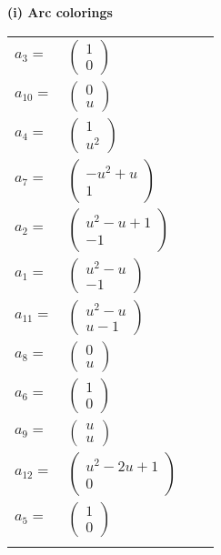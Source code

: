 \documentclass[1p]{elsarticle_modified}
\theoremstyle{definition}
\begin{document}
\flushleft \textbf{(i) Arc colorings}\\
\begin{tabular}{m{7pt} m{180pt} m{7pt} m{180pt} }
\flushright $a_{3}=$&$\begin{pmatrix}1\\0\end{pmatrix}$ \\
\flushright $a_{10}=$&$\begin{pmatrix}0\\u\end{pmatrix}$ \\
\flushright $a_{4}=$&$\begin{pmatrix}1\\u^2\end{pmatrix}$ \\
\flushright $a_{7}=$&$\begin{pmatrix}- u^2+u\\1\end{pmatrix}$ \\
\flushright $a_{2}=$&$\begin{pmatrix}u^2- u+1\\-1\end{pmatrix}$ \\
\flushright $a_{1}=$&$\begin{pmatrix}u^2- u\\-1\end{pmatrix}$ \\
\flushright $a_{11}=$&$\begin{pmatrix}u^2- u\\u-1\end{pmatrix}$ \\
\flushright $a_{8}=$&$\begin{pmatrix}0\\u\end{pmatrix}$ \\
\flushright $a_{6}=$&$\begin{pmatrix}1\\0\end{pmatrix}$ \\
\flushright $a_{9}=$&$\begin{pmatrix}u\\u\end{pmatrix}$ \\
\flushright $a_{12}=$&$\begin{pmatrix}u^2-2 u+1\\0\end{pmatrix}$ \\
\flushright $a_{5}=$&$\begin{pmatrix}1\\0\end{pmatrix}$\\&\end{tabular}
\end{document}
